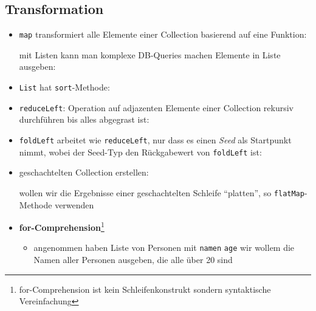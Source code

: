 \subsection{Transformation}
\begin{itemize}
  \item \texttt{map} transformiert alle Elemente einer Collection
  basierend auf eine Funktion:
  
  
  
  
  mit Listen kann man komplexe DB-Queries machen
  \und Elemente in Liste ausgeben:
  
  
  
  \item \texttt{List} hat \texttt{sort}-Methode:
  
  
  
  \item \texttt{reduceLeft}: Operation auf adjazenten Elemente einer
  Collection rekursiv durchführen bis alles abgegrast ist:
  
  
  
  \item \texttt{foldLeft} arbeitet wie \texttt{reduceLeft}, nur dass es 
  einen \textit{Seed} als Startpunkt nimmt, wobei der Seed-Typ den Rückgabewert von \texttt{foldLeft} ist:
  
  
  
  \item geschachtelten Collection erstellen:
  
  
  
  wollen wir die Ergebnisse einer geschachtelten Schleife 
  \enquote{platten}, so \texttt{flatMap}-Methode verwenden
  
  \item \textbf{for-Comprehension}\footnote{for-Comprehension ist 
  kein Schleifenkonstrukt sondern syntaktische Vereinfachung}
  \begin{itemize}
    \item angenommen haben Liste von Personen mit \texttt{namen} \und 
    \texttt{age} \und wir wollem die Namen aller Personen ausgeben, die
    alle über 20 sind
    

\end{itemize}
\end{itemize}
